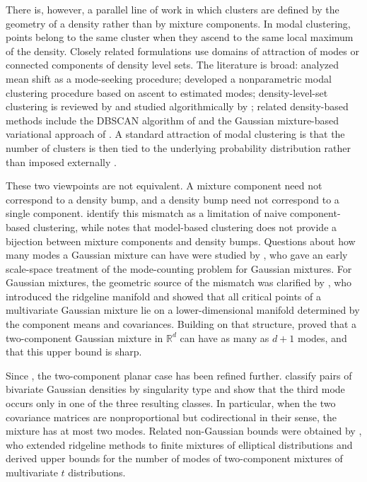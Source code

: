 \documentclass[11pt]{article}
\theoremstyle{plain}
\theoremstyle{definition}
\theoremstyle{remark}
\numberwithin{equation}{section}
\newcommand{\R}{\mathbb{R}}
\begin{document}
There is, however, a parallel line of work in which clusters are defined by the geometry of a density rather than by mixture components. In modal clustering, points belong to the same cluster when they ascend to the same local maximum of the density. Closely related formulations use domains of attraction of modes or connected components of density level sets. The literature is broad: \citet{Cheng1995} analyzed mean shift as a mode-seeking procedure; \citet{LiRayLindsay2007} developed a nonparametric modal clustering procedure based on ascent to estimated modes; density-level-set clustering is reviewed by \citet{Menardi2016} and studied algorithmically by \citet{Steinwart2011}; related density-based methods include the DBSCAN algorithm of \citet{EsterEtAl1996} and the Gaussian mixture-based variational approach of \citet{LeMinhArbelForbesNguyen2026}. A standard attraction of modal clustering is that the number of clusters is then tied to the underlying probability distribution rather than imposed externally \citep{Menardi2016}.

These two viewpoints are not equivalent. A mixture component need not correspond to a density bump, and a density bump need not correspond to a single component. \citet{LiRayLindsay2007} identify this mismatch as a limitation of naive component-based clustering, while \citet{Menardi2016} notes that model-based clustering does not provide a bijection between mixture components and density bumps. Questions about how many modes a Gaussian mixture can have were studied by \citet{CarreiraPerpinanWilliams2003}, who gave an early scale-space treatment of the mode-counting problem for Gaussian mixtures. For Gaussian mixtures, the geometric source of the mismatch was clarified by \citet{RayLindsay2005}, who introduced the ridgeline manifold and showed that all critical points of a multivariate Gaussian mixture lie on a lower-dimensional manifold determined by the component means and covariances. Building on that structure, \citet{RayRen2012} proved that a two-component Gaussian mixture in $\R^d$ can have as many as $d+1$ modes, and that this upper bound is sharp.

Since \citet{RayRen2012}, the two-component planar case has been refined further. \citet{KabataMatsumotoUchidaUeki2025} classify pairs of bivariate Gaussian densities by singularity type and show that the third mode occurs only in one of the three resulting classes. In particular, when the two covariance matrices are nonproportional but codirectional in their sense, the mixture has at most two modes. Related non-Gaussian bounds were obtained by \citet{AlexandrovichHolzmannRay2013}, who extended ridgeline methods to finite mixtures of elliptical distributions and derived upper bounds for the number of modes of two-component mixtures of multivariate $t$ distributions.
\end{document}
